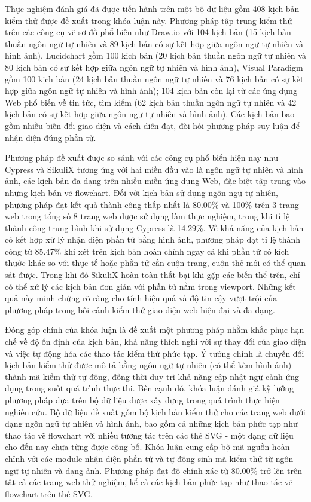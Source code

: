 \documentclass[a4paper, 12pt]{report}
\begin{document}
Thực nghiệm đánh giá đã được tiến hành trên một bộ dữ liệu gồm 408 kịch bản kiểm thử được đề xuất trong khóa luận này. Phương pháp tập trung kiểm thử trên các công cụ vẽ sơ đồ phổ biến như Draw.io với 104 kịch bản (15 kịch bản thuần ngôn ngữ tự nhiên và 89 kịch bản có sự kết hợp giữa ngôn ngữ tự nhiên và hình ảnh), Lucidchart gồm 100 kịch bản (20 kịch bản thuần ngôn ngữ tự nhiên và 80 kịch bản có sự kết hợp giữa ngôn ngữ tự nhiên và hình ảnh), Visual Paradigm gồm 100 kịch bản (24 kịch bản thuần ngôn ngữ tự nhiên và 76 kịch bản có sự kết hợp giữa ngôn ngữ tự nhiên và hình ảnh); 104 kịch bản còn lại từ các ứng dụng Web phổ biến về tin tức, tìm kiếm (62 kịch bản thuần ngôn ngữ tự nhiên và 42 kịch bản có sự kết hợp giữa ngôn ngữ tự nhiên và hình ảnh). Các kịch bản bao gồm nhiều biến đổi giao diện và cách diễn đạt, đòi hỏi phương pháp suy luận để nhận diện đúng phần tử. 


Phương pháp đề xuất được so sánh với các công cụ phổ biến hiện nay như Cypress và SikuliX tương ứng với hai miền đầu vào là ngôn ngữ tự nhiên và hình ảnh, các kịch bản đa dạng trên nhiều miền ứng dụng Web, đặc biệt tập trung vào những kịch bản vẽ flowchart. Đối với kịch bản sử dụng ngôn ngữ tự nhiên, phương pháp đạt kết quả thành công thấp nhất là 80.00\% và 100\% trên 3 trang web trong tổng số 8 trang web được sử dụng làm thực nghiệm, trong khi tỉ lệ thành công trung bình khi sử dụng Cypress là 14.29\%. Về khả năng của kịch bản có kết hợp xử lý nhận diện phần tử bằng hình ảnh, phương pháp đạt tỉ lệ thành công từ 85.47\% khi xét trên kịch bản hoàn chỉnh ngay cả khi phần tử có kích thước khác so với thực tế hoặc phần tử cần cuộn trang, cuộn thẻ mới có thể quan sát được. Trong khi đó SikuliX hoàn toàn thất bại khi gặp các biến thể trên, chỉ có thể xử lý các kịch bản đơn giản với phần tử nằm trong viewport. Những kết quả này minh chứng rõ ràng cho tính hiệu quả và độ tin cậy vượt trội của phương pháp trong bối cảnh kiểm thử giao diện web hiện đại và đa dạng.


Đóng góp chính của khóa luận là đề xuất một phương pháp nhằm khắc phục hạn chế về độ ổn định của kịch bản, khả năng thích nghi với sự thay đổi của giao diện và việc tự động hóa các thao tác kiểm thử phức tạp. Ý tưởng chính là chuyển đổi kịch bản kiểm thử được mô tả bằng ngôn ngữ tự nhiên (có thể kèm hình ảnh) thành mã kiểm thử tự động, đồng thời duy trì khả năng cập nhật ngữ cảnh ứng dụng trong suốt quá trình thực thi. Bên cạnh đó, khóa luận đánh giá kỹ lưỡng phương pháp dựa trên bộ dữ liệu được xây dựng trong quá trình thực hiện nghiên cứu. Bộ dữ liệu đề xuất gồm bộ kịch bản kiểm thử cho các trang web dưới dạng ngôn ngữ tự nhiên và hình ảnh, bao gồm cả những kịch bản phức tạp như thao tác vẽ flowchart với nhiều tương tác trên các thẻ SVG - một dạng dữ liệu cho đến nay chưa từng được công bố. Khóa luận cung cấp bộ mã nguồn hoàn chỉnh với các module nhận diện phần tử và tự động sinh mã kiểm thử từ ngôn ngữ tự nhiên và dạng ảnh. Phương pháp đạt độ chính xác từ 80.00\% trở lên trên tất cả các trang web thử nghiệm, kể cả các kịch bản phức tạp như thao tác vẽ flowchart trên thẻ SVG.
\end{document}
